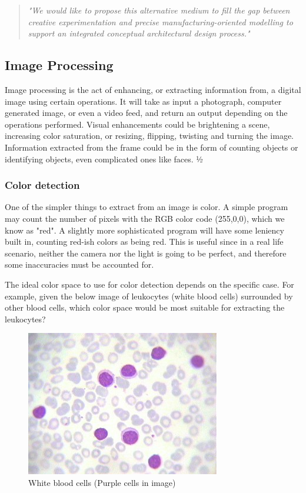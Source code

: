 			\begin{quote}
				\textit{"We would like to propose this alternative medium to fill the gap between creative experimentation and precise manufacturing-oriented modelling to support an integrated conceptual architectural design process."}\cite{sketchingVsCAD}\label{proposalForMedium}\\
			\end{quote}

			\subsection{Image Processing}
			Image processing is the act of enhancing, or extracting information from, a digital image using certain operations. It will take as input a photograph, computer generated image, or even a video feed, and return an output depending on the operations performed. Visual enhancements could be brightening a scene, increasing color saturation, or resizing, flipping, twisting and turning the image. Information extracted from the frame could be  in the form of counting objects or identifying objects, even complicated ones like faces. 
		½
			\subsubsection{Color detection}
			One of the simpler things to extract from an image is color. A simple program may count the number of pixels with the RGB color code (255,0,0), which we know as "red". A slightly more sophisticated program will have some leniency built in, counting red-ish colors as being red. This is useful since in a real life scenario, neither the camera nor the light is going to be perfect, and therefore some inaccuracies must be accounted for. 
			
			The ideal color space to use for color detection depends on the specific case. 
			For example, given the below image of leukocytes (white blood cells) surrounded by other blood cells, which color space would be most suitable for extracting the leukocytes?
			\begin{figure}[H]
				\centering
				\includegraphics[width=0.2\linewidth]{figure/Analysis/leukocytes.jpg}
				\caption{White blood cells (Purple cells in image)}
				\label{fig:leukocytes}
			\end{figure}
			
